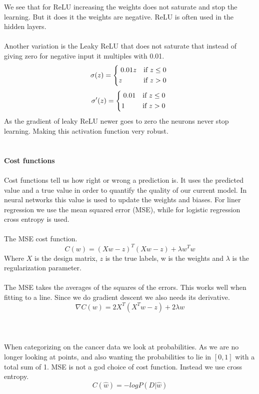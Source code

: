 \documentclass[12pt, letterpaper, twoside]{article}
\begin{document}
We see that for ReLU increasing the weights does not saturate and stop the learning. But it does it the weights are negative. ReLU is often used in the hidden layers.\\
\ \\
Another variation is the Leaky ReLU that does not saturate that instead of giving zero for negative input it multiples with 0.01.\\
\[
    \sigma(z) =
    \begin{dcases*}
  		\; 0.01z & if $z \leq 0 $ \\
  		z & if $z > 0$
	\end{dcases*}
\]
\[
    \sigma'(z) =
    \begin{dcases*}
  		\; 0.01 & if $z \leq 0 $ \\
  		1 & if $z > 0$
	\end{dcases*}
\]
As the gradient of leaky ReLU newer goes to zero the neurons never stop learning. Making this activation function very robust.\\
\ \\
\ \\
\textbf{Cost functions}\\
\ \\
Cost functions tell us how right or wrong a prediction is. It uses the predicted value and a true value in order to quantify the quality of our current model. 
In neural networks this value is used to update the weights and biases. For liner regression we use the mean squared error (MSE), while for logistic regression cross entropy is used.\\
\ \\
The MSE cost function.
$$
C(w) = (Xw - z)^T(Xw - z) + \lambda w^T w
$$
Where $X$ is the design matrix, $z$ is the true labels, w is the weights and $\lambda$ is the regularization parameter.\\
\ \\
The MSE takes the averages of the squares of the errors. This works well when fitting to a line. Since we do gradient descent we also needs its derivative.
$$
\nabla C(w) = 2 X^T (X^T w - z) + 2 \lambda w
$$\\
\ \\
\ \\
When categorizing on the cancer data we look at probabilities. As we are no longer looking at points, and also wanting the probabilities to lie in $[0,1]$ with a total sum of 1. MSE is not a god choice of cost function. Instead we use cross entropy.
$$
C(\hat{w}) = -log P(D|\hat{w})
$$  
\ \\
\end{document}
